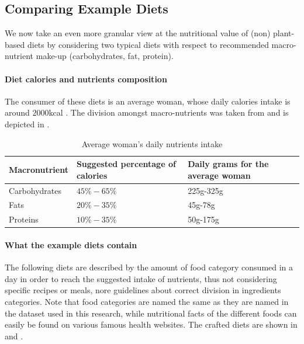 \documentclass{article}
\begin{document}
\subsection{Comparing Example Diets}
We now take an even more granular view at the nutritional value of (non) plant-based diets by considering two typical diets with respect to recommended macro-nutrient make-up (carbohydrates, fat, protein).

\paragraph*{Diet calories and nutrients composition}
The consumer of these diets is an average woman, whose daily calories intake is around $2000$kcal \cite{NHS}. The division amongst macro-nutrients was taken from \citet{Healthline} and is depicted in  .

\begin{table}[h]
  \caption{Average woman's daily nutrients intake}
  \label{tbl:composition}
  \centering
  \begin{tabular}{lll}
    \toprule
    Macronutrient     & Suggested percentage of calories   & Daily grams for the average woman  \\
    \midrule
    Carbohydrates & $45\%-65\%$ &  225g-325g  \\
    Fats    & $20\%-35\% $  & 45g-78g \\
    Proteins & $10\%-35\%$ & 50g-175g \\
    \bottomrule
  \end{tabular}
\end{table}

\paragraph*{What the example diets contain}
The following diets are described by the amount of food category consumed in a day in order to reach the suggested intake of nutrients, thus not considering specific recipes or meals, nore guidelines about correct division in ingredients categories. Note that food categories are named the same as they are named in the dataset used in this research, while nutritional facts of the different foods can easily be found on various famous health websites. The crafted diets are shown in  and .
\end{document}
